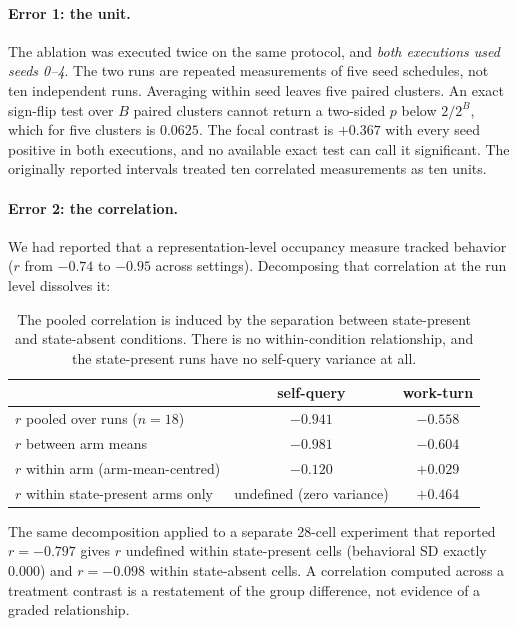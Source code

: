 \documentclass[11pt]{article}
\begin{document}
\paragraph{Error 1: the unit.} The ablation was executed twice on the same protocol, and \emph{both executions used seeds 0--4}. The two runs are repeated measurements of five seed schedules, not ten independent runs. Averaging within seed leaves five paired clusters. An exact sign-flip test over $B$ paired clusters cannot return a two-sided $p$ below $2/2^B$, which for five clusters is $0.0625$. The focal contrast is $+0.367$ with every seed positive in both executions, and no available exact test can call it significant. The originally reported intervals treated ten correlated measurements as ten units.

\paragraph{Error 2: the correlation.} We had reported that a representation-level occupancy measure tracked behavior ($r$ from $-0.74$ to $-0.95$ across settings). Decomposing that correlation at the run level dissolves it:

\begin{table}[h]
\centering\small
\begin{tabular}{lcc}
\toprule
& self-query & work-turn \\
\midrule
$r$ pooled over runs ($n=18$) & $-0.941$ & $-0.558$ \\
$r$ between arm means & $-0.981$ & $-0.604$ \\
$r$ within arm (arm-mean-centred) & $-0.120$ & $+0.029$ \\
$r$ within state-present arms only & undefined (zero variance) & $+0.464$ \\
\bottomrule
\end{tabular}
\caption{The pooled correlation is induced by the separation between state-present and state-absent conditions. There is no within-condition relationship, and the state-present runs have no self-query variance at all.}
\label{tab:corr}
\end{table}

The same decomposition applied to a separate 28-cell experiment that reported $r=-0.797$ gives $r$ undefined within state-present cells (behavioral SD exactly $0.000$) and $r=-0.098$ within state-absent cells. A correlation computed across a treatment contrast is a restatement of the group difference, not evidence of a graded relationship.
\end{document}

